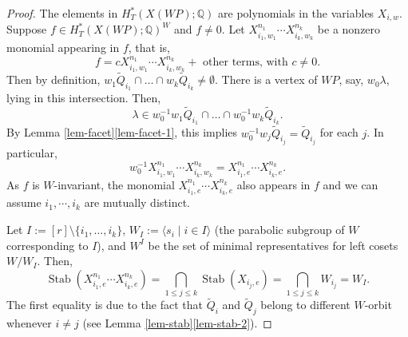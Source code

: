 \documentclass[10pt,a4paper]{amsart}
\begin{document}
\begin{proof}
    The elements in $H^*_T(X(\mathit{WP}) ; \mathbb{Q})$ are polynomials in the variables $X_{i,w}$.
    Suppose $f \in H^*_T(X(\mathit{WP}) ; \mathbb{Q})^W$ and $f \ne 0$.
    Let $X_{i_1, w_1}^{n_1} \cdots X_{i_k, w_k}^{n_k}$ be a nonzero monomial appearing in $f$, that is,
    \[f = c X_{i_1, w_1}^{n_1} \cdots X_{i_k, w_k}^{n_k} + \text{ other terms, with $c \ne 0$}.\]
    Then by definition, $w_1 \widetilde{Q}_{i_1} \cap \dots \cap w_k \widetilde{Q}_{i_k} \ne \emptyset$.
    There is a vertex of $\mathit{WP}$, say, $w_0\lambda$, lying in this intersection.
    Then, 
    \[\lambda \in w_0^{-1} w_1 \widetilde{Q}_{i_1} \cap \dots \cap w_0^{-1} w_k \widetilde{Q}_{i_k}.\] 
    By Lemma \ref{lem-facet}\eqref{lem-facet-1}, this implies $w_0^{-1} w_j \widetilde{Q}_{i_j} = \widetilde{Q}_{i_j}$ for each $j$. 
    In particular,
    \[w_0^{-1} X_{i_1, w_1}^{n_1} \cdots X_{i_k, w_k}^{n_k} = X_{i_1, e}^{n_1} \cdots X_{i_k, e}^{n_k}.\]
    As $f$ is $W$-invariant, the monomial $X_{i_1, e}^{n_1} \cdots X_{i_k, e}^{n_k}$ also appears in $f$ and we can assume $i_1, \cdots, i_k$ are mutually distinct.

    Let $I := [r] \setminus \{i_1, \dots, i_k\}$, $W_I := \langle s_i \mid i\in I \rangle$ (the parabolic subgroup of $W$ corresponding to $I$), and $W^I$ be the set of minimal representatives for left cosets $W / W_I$.
    Then,
    \[\operatorname{Stab}(X_{i_1, e}^{n_1} \cdots X_{i_k, e}^{n_k}) = \bigcap_{1 \le j \le k} \operatorname{Stab}(X_{i_j,e}) = \bigcap_{1 \le j \le k} W_{i_j} = W_I.\]
    The first equality is due to the fact that $\widetilde{Q}_i$ and $\widetilde{Q}_j$ belong to different $W$-orbit whenever $i \ne j$ (see Lemma \ref{lem-stab}\eqref{lem-stab-2}).
    

\end{proof}
\end{document}

